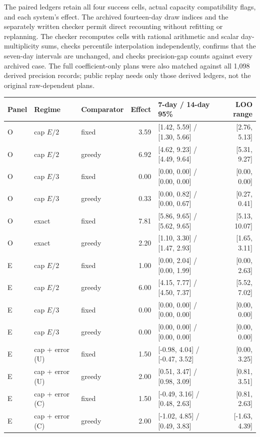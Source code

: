 The paired ledgers retain all four success cells, actual capacity compatibility
flags, and each system's effect. The archived fourteen-day draw indices and
the separately written checker permit direct recounting without refitting or
replanning. The checker recomputes cells with rational arithmetic and scalar
day-multiplicity sums, checks percentile interpolation independently, confirms
that the seven-day intervals are unchanged, and checks precision-gap counts
against every archived case. The full coefficient-only plans were also matched
against all 1,098 derived precision records; public replay needs only those
derived ledgers, not the original raw-dependent plans.
\begin{table}[htbp]
\centering\scriptsize
\begin{tabular}{lllrlr}
\toprule
Panel & Regime & Comparator & Effect & 7-day / 14-day 95\% & LOO range\\
\midrule
O & cap $E/2$ & fixed & 3.59 & [1.42, 5.59] / [1.30, 5.66] & [2.76, 5.13]\\
O & cap $E/2$ & greedy & 6.92 & [4.62, 9.23] / [4.49, 9.64] & [5.31, 9.27]\\
O & cap $E/3$ & fixed & 0.00 & [0.00, 0.00] / [0.00, 0.00] & [0.00, 0.00]\\
O & cap $E/3$ & greedy & 0.33 & [0.00, 0.82] / [0.00, 0.67] & [0.27, 0.41]\\
O & exact & fixed & 7.81 & [5.86, 9.65] / [5.62, 9.65] & [5.13, 10.07]\\
O & exact & greedy & 2.20 & [1.10, 3.30] / [1.47, 2.93] & [1.65, 3.11]\\
E & cap $E/2$ & fixed & 1.00 & [0.00, 2.04] / [0.00, 1.99] & [0.00, 2.63]\\
E & cap $E/2$ & greedy & 6.00 & [4.15, 7.77] / [4.50, 7.37] & [5.52, 7.02]\\
E & cap $E/3$ & fixed & 0.00 & [0.00, 0.00] / [0.00, 0.00] & [0.00, 0.00]\\
E & cap $E/3$ & greedy & 0.00 & [0.00, 0.00] / [0.00, 0.00] & [0.00, 0.00]\\
E & cap + error (U) & fixed & 1.50 & [-0.98, 4.04] / [-0.47, 3.52] & [0.00, 3.25]\\
E & cap + error (U) & greedy & 2.00 & [0.51, 3.47] / [0.98, 3.09] & [0.81, 3.51]\\
E & cap + error (C) & fixed & 1.50 & [-0.49, 3.16] / [0.48, 2.63] & [0.81, 2.63]\\
E & cap + error (C) & greedy & 2.00 & [-1.02, 4.85] / [0.49, 3.83] & [-1.63, 4.39]\\

\end{tabular}
\end{table}
